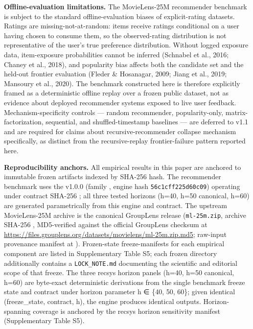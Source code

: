 \documentclass[
  11pt,
]{article}
\begin{document}
\textbf{Offline-evaluation limitations.} The MovieLens-25M recommender
benchmark is subject to the standard offline-evaluation biases of
explicit-rating datasets. Ratings are missing-not-at-random: items
receive ratings conditional on a user having chosen to consume them, so
the observed-rating distribution is not representative of the user's
true preference distribution. Without logged exposure data,
item-exposure probabilities cannot be inferred (Schnabel et al., 2016;
Chaney et al., 2018), and popularity bias affects both the candidate set
and the held-out frontier evaluation (Fleder \& Hosanagar, 2009; Jiang
et al., 2019; Mansoury et al., 2020). The benchmark constructed here is
therefore explicitly framed as a deterministic offline replay over a
frozen public dataset, not as evidence about deployed recommender
systems exposed to live user feedback. Mechanism-specificity controls
--- random recommender, popularity-only, matrix-factorization,
sequential, and shuffled-timestamp baselines --- are deferred to v1.1
and are required for claims about recursive-recommender collapse
mechanism specifically, as distinct from the recursive-replay
frontier-failure pattern reported here.

\textbf{Reproducibility anchors.} All empirical results in this paper
are anchored to immutable frozen artifacts indexed by SHA-256 hash. The
recommender benchmark uses the
\texttt{} v1.0.0 (family
\texttt{}, engine hash
\texttt{56c1cff225d60c09}) operating under contract SHA-256
\texttt{};
all three tested horizons (h=40, h=50 canonical, h=60) are generated
parametrically from this engine and contract. The upstream MovieLens-25M
archive is the canonical GroupLens release (\texttt{ml-25m.zip}, archive
SHA-256
\texttt{},
MD5-verified against the official GroupLens checksum at
\url{https://files.grouplens.org/datasets/movielens/ml-25m.zip.md5};
raw-input provenance manifest at
\texttt{}).
Frozen-state freeze-manifests for each empirical component are listed in
Supplementary Table S5; each frozen directory additionally contains a
\texttt{LOCK\_NOTE.md} documenting the scientific and editorial scope of
that freeze. The three recsys horizon panels (h=40, h=50 canonical,
h=60) are byte-exact deterministic derivations from the single benchmark
freeze state and contract under horizon parameter h ∈ \{40, 50, 60\};
given identical (freeze\_state, contract, h), the engine produces
identical outputs. Horizon-spanning coverage is anchored by the recsys
horizon sensitivity manifest (Supplementary Table S5).
\end{document}
